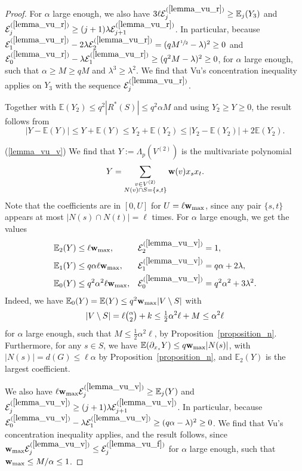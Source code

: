 \documentclass{article}
\theoremstyle{plain}
\theoremstyle{remark}
\theoremstyle{plain}
\numberwithin{equation}{section}
\renewcommand{\b}{{\bf{w}}}
\begin{document}
\begin{proof}
		For $\alpha$ large enough, we also have $3\ell\mathcal{E}_j^{(\ref{lemma_vu_r})}\geq\mathbb{E}_j(Y_3)$ and $\mathcal{E}_j^{(\ref{lemma_vu_r})}\geq(j+1)\lambda\mathcal{E}_{j+1}^{(\ref{lemma_vu_r})}$. In particular, because $\mathcal{E}_1^{(\ref{lemma_vu_r})}-2\lambda\mathcal{E}_2^{(\ref{lemma_vu_r})}=(qM^{\sfrac12}-\lambda)^2\geq0$ and $\mathcal{E}_0^{(\ref{lemma_vu_r})}-\lambda\mathcal{E}_1^{(\ref{lemma_vu_r})}\geq(q^2M-\lambda)^2\geq0$, for $\alpha$ large enough, such that $\alpha\geq M\geq qM$ and $\lambda^3\geq\lambda^2$. We find that Vu's concentration inequality applies on $Y_3$ with the sequence $\mathcal{E}^{(\ref{lemma_vu_r})}_j$.
		
		Together with $\mathbb{E}(Y_2)\leq q^2|R^*(S)|\leq q^2\alpha M$ and using $Y_2\geq Y\geq0$, the result follows from $$|Y-\mathbb{E}(Y)|\leq Y+\mathbb{E}(Y)\leq Y_2+\mathbb{E}(Y_2)\leq |Y_2-\mathbb{E}(Y_2)|+2\mathbb{E}(Y_2).$$
		
		(\ref{lemma_vu_v}) We find that $Y:=\Lambda_p(V^{(2)})$ is the multivariate polynomial $$Y=\sum_{\substack{v\in V^{(2)}\\N(v)\cap S=\{s,t\}}}\b(v)x_sx_t.$$ Note that the coefficients are in $[0,U]$ for $U=\ell\b_{\max}$, since any pair $\{s,t\}$ appears at most $|N(s)\cap N(t)|=\ell$ times. For $\alpha$ large enough, we get the values
		\begin{align}
			\mathbb{E}_2(Y)&\leq\ell\b_{\max},&\mathcal{E}_2^{(\ref{lemma_vu_v})}&=1,
			\\\mathbb{E}_1(Y)&\leq q\alpha\ell\b_{\max},&\mathcal{E}_1^{(\ref{lemma_vu_v})}&=q\alpha+2\lambda,
			\\\mathbb{E}_0(Y)&\leq q^2\alpha^2\ell\b_{\max},&\mathcal{E}_0^{(\ref{lemma_vu_v})}&=q^2\alpha^2+3\lambda^2.
		\end{align}
		Indeed, we have $\mathbb{E}_0(Y)=\mathbb{E}(Y)\leq q^2\b_{\max}|V\setminus S|$ with $$|V\setminus S|=\ell\tbinom{\alpha}{2}+k\leq\tfrac12\alpha^2\ell+M\leq\alpha^2\ell$$ for $\alpha$ large enough, such that $M\leq\frac12\alpha^2\ell$, by Proposition~\ref{proposition_n}. Furthermore, for any $s\in S$, we have $\mathbb{E}(\partial_{x_s}Y)\leq q\b_{\max}|N(s)|$, with $|N(s)|=d(G)\leq\ell\alpha$ by Proposition~\ref{proposition_n}, and $\mathbb{E}_2(Y)$ is the largest coefficient.
		
		We also have $\ell\b_{\max}\mathcal{E}_j^{(\ref{lemma_vu_v})}\geq\mathbb{E}_j(Y)$ and $\mathcal{E}_j^{(\ref{lemma_vu_v})}\geq(j+1)\lambda\mathcal{E}_{j+1}^{(\ref{lemma_vu_v})}$. In particular, because $\mathcal{E}_0^{(\ref{lemma_vu_v})}-\lambda\mathcal{E}_1^{(\ref{lemma_vu_v})}\geq(q\alpha-\lambda)^2\geq0$. We find that Vu's concentration inequality applies, and the result follows, since $\b_{\max}\mathcal{E}_j^{(\ref{lemma_vu_v})}\leq\mathcal{E}_j^{(\ref{lemma_vu_f})}$ for $\alpha$ large enough, such that $\b_{\max}\leq M/\alpha\leq1$.
		

\end{proof}
\end{document}
